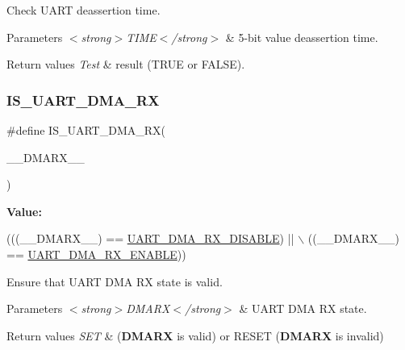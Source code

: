 Check U\+A\+RT deassertion time. 


\begin{DoxyParams}{Parameters}
{\em $<$strong$>$\+T\+I\+M\+E$<$/strong$>$} & 5-\/bit value deassertion time. \\
\hline
\end{DoxyParams}

\begin{DoxyRetVals}{Return values}
{\em Test} & result (T\+R\+UE or F\+A\+L\+SE). \\
\hline
\end{DoxyRetVals}
\mbox{\label{group___u_a_r_t___private___macros_ga85c4c9339de2076106942cd9ab61ad77}} 
\subsubsection{\texorpdfstring{I\+S\+\_\+\+U\+A\+R\+T\+\_\+\+D\+M\+A\+\_\+\+RX}{IS\_UART\_DMA\_RX}}
{\footnotesize\ttfamily \#define I\+S\+\_\+\+U\+A\+R\+T\+\_\+\+D\+M\+A\+\_\+\+RX(\begin{DoxyParamCaption}\item[{}]{\+\_\+\+\_\+\+D\+M\+A\+R\+X\+\_\+\+\_\+ }\end{DoxyParamCaption})}

{\bfseries Value\+:}
\begin{DoxyCode}
(((\_\_DMARX\_\_) == \hyperlink{group___u_a_r_t___d_m_a___rx_gac65987cb4d8fd5da0f7dc695312f6afa}{UART\_DMA\_RX\_DISABLE}) || \(\backslash\)
                                       ((\_\_DMARX\_\_) == \hyperlink{group___u_a_r_t___d_m_a___rx_gab871994de6d36a02b8ec34af197dff1d}{UART\_DMA\_RX\_ENABLE}))
\end{DoxyCode}


Ensure that U\+A\+RT D\+MA RX state is valid. 


\begin{DoxyParams}{Parameters}
{\em $<$strong$>$\+D\+M\+A\+R\+X$<$/strong$>$} & U\+A\+RT D\+MA RX state. \\
\hline
\end{DoxyParams}

\begin{DoxyRetVals}{Return values}
{\em S\+ET} & ({\bfseries D\+M\+A\+RX} is valid) or R\+E\+S\+ET ({\bfseries D\+M\+A\+RX} is invalid) \\
\hline
\end{DoxyRetVals}
\mbox{\label{group___u_a_r_t___private___macros_ga433107c59f6d1c66a38e53e38fdc0a57}} 
